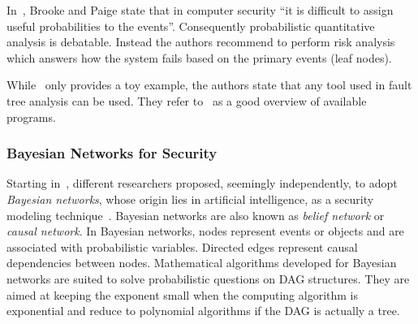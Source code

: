 \documentclass[a4paper]{article}
\begin{document}
In~\cite{BrPa}, Brooke and Paige state that in computer security ``it is
difficult to assign useful probabilities to the events''. Consequently
probabilistic quantitative analysis is debatable. Instead the authors
recommend to perform risk analysis which answers how the system fails based on
the primary events (leaf nodes).

While~\cite{BrPa} only provides a toy example, the authors state that any tool
used in fault tree analysis can be used. They refer to~\cite{Website_FTAP} as
a good overview of available programs.

\subsubsection{Bayesian Networks for Security} 
\label{sec:bayesian_networks}

Starting in~, different researchers proposed, seemingly independently, to
adopt \emph{Bayesian networks}, whose origin lies in artificial intelligence, 
as a security modeling technique~\cite{Pear2,Pear,Neap,JeNi}. Bayesian networks
are also known as \emph{belief network} or \emph{causal network}. In Bayesian
networks, nodes represent events or objects and are associated with
probabilistic variables. Directed edges represent causal dependencies between
nodes. Mathematical algorithms developed for Bayesian networks are suited to
solve probabilistic questions on DAG structures. They are aimed at keeping the
exponent small when the computing algorithm is exponential and reduce to 
polynomial algorithms if the DAG is actually a tree.
\end{document}
